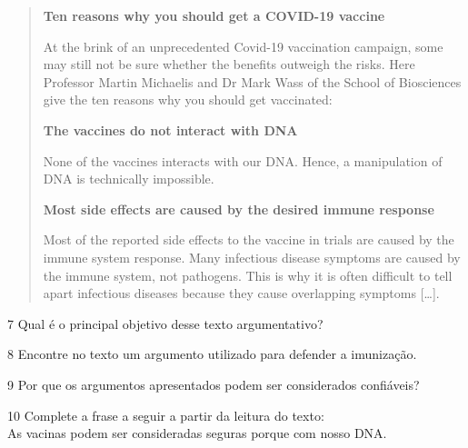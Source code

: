 \begin{quote}
\textbf{Ten reasons why you should get a COVID-19 vaccine}

At the brink of an unprecedented Covid-19 vaccination campaign, some may
still not be sure whether the benefits outweigh the risks. Here
Professor Martin Michaelis and Dr Mark Wass of the School of Biosciences
give the ten reasons why you should get vaccinated:

\textbf{The vaccines do not interact with DNA}

None of the vaccines interacts with our DNA. Hence, a manipulation of
DNA is technically impossible.

\textbf{Most side effects are caused by the desired immune response}

Most of the reported side effects to the vaccine in trials are caused by
the immune system response. Many infectious disease symptoms are caused
by the immune system, not pathogens. This is why it is often difficult
to tell apart infectious diseases because they cause overlapping
symptoms {[}\ldots{}{]}.

\end{quote}

\num{7} Qual é o principal objetivo desse texto argumentativo?



\num{8} Encontre no texto um argumento utilizado para defender a
imunização.



\num{9} Por que os argumentos apresentados podem ser considerados
confiáveis?



\num{10} Complete a frase a seguir a partir da leitura do texto:\\
As vacinas podem ser consideradas seguras porque \preencher com nosso DNA.

